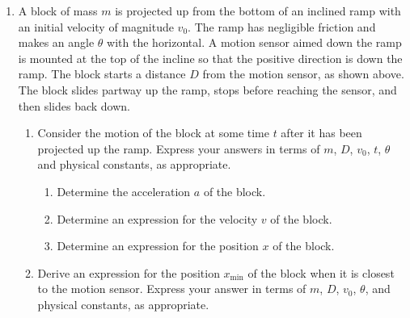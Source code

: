 \documentclass{../../../oss-classkick}
\begin{document}
\begin{enumerate}[leftmargin=15pt]

\item A block of mass $m$ is projected up from the bottom of an inclined ramp
  with an initial velocity of magnitude $v_0$. The ramp has negligible friction
  and makes an angle $\theta$ with the horizontal. A motion sensor aimed down
  the ramp is mounted at the top of the incline so that the positive direction
  is down the ramp. The block starts a distance $D$ from the motion sensor, as
  shown above. The block slides partway up the ramp, stops before reaching the
  sensor, and then slides back down.
  \begin{enumerate}[leftmargin=15pt]
  \item Consider the motion of the block at some time $t$ after it has been
    projected up the ramp. Express your answers in terms of $m$, $D$, $v_0$,
    $t$, $\theta$ and physical constants, as appropriate.
    \begin{enumerate}[nosep,leftmargin=15pt]
    \item Determine the acceleration $a$ of the block.
    \item Determine an expression for the velocity $v$ of the block.
    \item Determine an expression for the position $x$ of the block.
    \end{enumerate}
    \vspace{3in}

  \item Derive an expression for the position $x_\text{min}$ of the block when
    it is closest to the motion sensor. Express your answer in terms of $m$,
    $D$, $v_0$, $\theta$, and physical constants, as appropriate.
    \vspace{1.5in}
    

\end{enumerate}
\end{enumerate}
\end{document}

